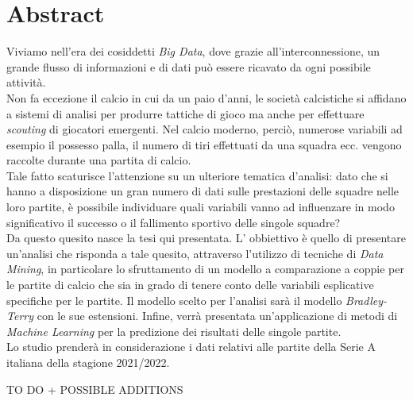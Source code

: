 
\cleardoublepage
{}
{}
\begingroup
\let\clearpage\relax
\let\cleardoublepage\relax
\let\cleardoublepage\relax

\chapter*{Abstract}

Viviamo nell'era dei cosiddetti \emph{Big Data}, dove grazie all'interconnessione, un grande flusso di informazioni e di dati può essere ricavato da ogni possibile attività. \\
Non fa eccezione il calcio in cui da un paio d'anni, le società calcistiche si affidano a sistemi di analisi per produrre tattiche di gioco ma anche per effettuare \textit{scouting} di giocatori emergenti. Nel calcio moderno, perciò, numerose variabili ad esempio il possesso palla, il numero di tiri effettuati da una squadra ecc. vengono raccolte durante una partita di calcio.\\
Tale fatto scaturisce l'attenzione su un ulteriore tematica d'analisi: dato che si hanno a disposizione un gran numero di dati sulle prestazioni delle squadre nelle loro partite, è possibile individuare quali variabili vanno ad influenzare in modo significativo il successo o il fallimento sportivo delle singole squadre? \\
Da questo quesito nasce la tesi qui presentata.  L’ obbiettivo è quello di presentare un'analisi che risponda a tale quesito, attraverso l'utilizzo di tecniche di \textit{Data Mining}, in particolare lo sfruttamento di un modello a comparazione a coppie per le partite di calcio che sia in grado di tenere conto delle variabili esplicative specifiche per le partite. Il modello scelto per l’analisi sarà il modello \emph{Bradley-Terry} con le sue estensioni.  Infine, verrà presentata un’applicazione di metodi di \textit{Machine Learning} per la predizione dei risultati delle singole partite. \\
Lo studio prenderà in considerazione i dati relativi alle partite della Serie A italiana della stagione 2021/2022.

TO DO + POSSIBLE ADDITIONS






%
%

\endgroup			

\vfill

